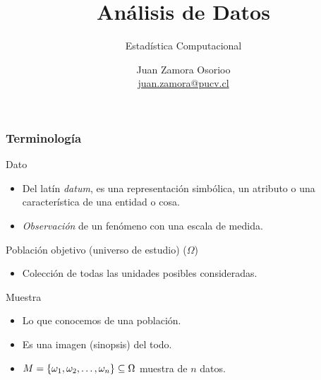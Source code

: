 \documentclass[table]{beamer}
\title{Análisis de Datos}
\subtitle{Estadística Computacional}
\author[J.Z.O-2023]{Juan Zamora Osorioo\\\url{juan.zamora@pucv.cl}}
\institute[PUCV]{Instituto de Estadística\\Pontificia Universidad Cat\'olica de Valpara\'iso}
\begin{document}
\begin{frame}[plain]
    \titlepage
\end{frame}





\begin{frame}
    \frametitle{Terminología}
    \begin{block}{Dato}
        \begin{itemize}
            \item Del latín \emph{datum}, es una representación simbólica, un atributo o una característica de una entidad o cosa.
            \item \emph{Observación} de un fenómeno con una escala de medida.
        \end{itemize}
    \end{block}
    \begin{block}{Población objetivo (universo de estudio) ($\Omega$)}
        \begin{itemize}
            \item Colección de todas las unidades posibles consideradas.
        \end{itemize}
    \end{block}
    \begin{block}{Muestra}
        \begin{itemize}
            \item Lo que conocemos de una población.
            \item Es una imagen (sinopsis) del todo.
            \item $M = \bparens{\omega_{1} , \omega_{2} , \ldots , \omega_{n}} \subseteq \Omega$ muestra de $n$ datos.
        \end{itemize}
    \end{block}
\end{frame}
\end{document}
